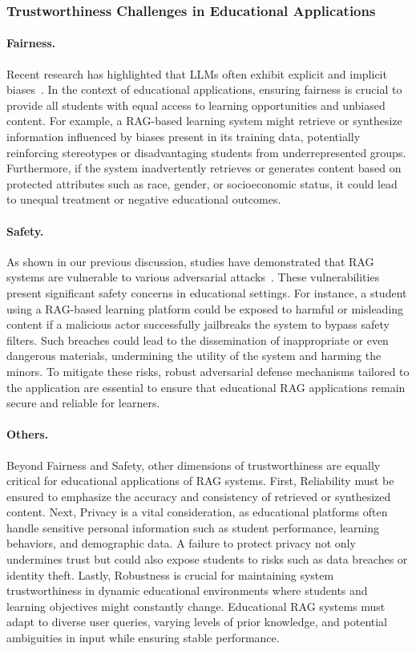 \subsubsection{Trustworthiness Challenges in Educational Applications}
\paragraph{Fairness.}
Recent research has highlighted that LLMs often exhibit explicit and implicit biases~\cite{wan2023genderbiases, sheng2021nice, sheng2021societal}. In the context of educational applications, ensuring fairness is crucial to provide all students with equal access to learning opportunities and unbiased content. For example, a RAG-based learning system might retrieve or synthesize information influenced by biases present in its training data, potentially reinforcing stereotypes or disadvantaging students from underrepresented groups. Furthermore, if the system inadvertently retrieves or generates content based on protected attributes such as race, gender, or socioeconomic status, it could lead to unequal treatment or negative educational outcomes. 

\paragraph{Safety.}
As shown in our previous discussion, studies have demonstrated that RAG systems are vulnerable to various adversarial attacks~\cite{deng2024pandorajailbreakgptsretrieval, xue2024badrag, wei2024jailbroken}. These vulnerabilities present significant safety concerns in educational settings. For instance, a student using a RAG-based learning platform could be exposed to harmful or misleading content if a malicious actor successfully jailbreaks the system to bypass safety filters. Such breaches could lead to the dissemination of inappropriate or even dangerous materials, undermining the utility of the system and harming the minors. To mitigate these risks, robust adversarial defense mechanisms tailored to the application are essential to ensure that educational RAG applications remain secure and reliable for learners.

\paragraph{Others.}
Beyond Fairness and Safety, other dimensions of trustworthiness are equally critical for educational applications of RAG systems. First, Reliability must be ensured to emphasize the accuracy and consistency of retrieved or synthesized content. Next, Privacy is a vital consideration, as educational platforms often handle sensitive personal information such as student performance, learning behaviors, and demographic data. A failure to protect privacy not only undermines trust but could also expose students to risks such as data breaches or identity theft. Lastly, Robustness is crucial for maintaining system trustworthiness in dynamic educational environments where students and learning objectives might constantly change. Educational RAG systems must adapt to diverse user queries, varying levels of prior knowledge, and potential ambiguities in input while ensuring stable performance. 
